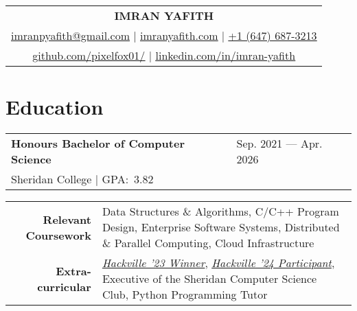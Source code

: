 \documentclass[a4paper, 12pt]{article}
\begin{document}
\color{regtextgray} %
\pagestyle{empty} %

\begin{tabularx}{\linewidth}{@{} C @{}}
    \textcolor{imptextblack}{\Huge{\textbf{IMRAN YAFITH}}}                                    \\[6pt]
    \underline{\href{mailto:imranpyafith@gmail.com}{\raisebox{-0.05\height}{\faEnvelope} imranpyafith@gmail.com}} $|$
    \underline{\href{https://imranyafith.com/}{\raisebox{-0.05\height}{\faGlobe} imranyafith.com}} $|$
    \underline{\href{tel:+16476873213}{\raisebox{-0.05\height}{\faMobile} +1 (647) 687-3213}} \\
    \underline{\href{https://github.com/pixelfox01}{\raisebox{-0.05\height}{\faGithub} github.com/pixelfox01/}} $|$
    \underline{\href{https://www.linkedin.com/in/imran-yafith-95a437266/}{\raisebox{-0.05\height}{\faLinkedin} linkedin.com/in/imran-yafith}}
\end{tabularx}


\vspace{6pt}

\section{Education}
\begin{tabularx}{\linewidth}{ @{}l X@{} }
    \textcolor{imptextblack}{\textbf{Honours Bachelor of Computer Science}} & \hfill Sep. 2021 --- Apr. 2026 \\
    \small{Sheridan College $|$ GPA:\ 3.82}
\end{tabularx}
\begin{center}
    \begin{tabular}{@{} r @{\hspace{2em}} p{} @{}}
        \textcolor{imptextblack}{\textbf{Relevant Coursework}} & Data Structures \& Algorithms, C/C++ Program Design, Enterprise Software Systems, Distributed \& Parallel Computing, Cloud Infrastructure                                                                                                             \\
        \textcolor{imptextblack}{\textbf{Extra-curricular}}    & \href{https://devpost.com/software/cybernexus}{\textit{Hackville '23 Winner}}, \href{https://devpost.com/software/pitchperfect-teu3zs}{\textit{Hackville '24 Participant}}, Executive of the Sheridan Computer Science Club, Python Programming Tutor \\
    \end{tabular}
\end{center}
\end{document}

